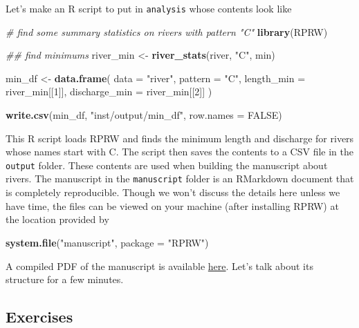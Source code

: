 \documentclass[
]{book}
\newenvironment{Shaded}{\begin{snugshade}}{\end{snugshade}}
\newcommand{\CommentTok}[1]{\textcolor[rgb]{0.56,0.35,0.01}{\textit{#1}}}
\newcommand{\DataTypeTok}[1]{\textcolor[rgb]{0.13,0.29,0.53}{#1}}
\newcommand{\DecValTok}[1]{\textcolor[rgb]{0.00,0.00,0.81}{#1}}
\newcommand{\KeywordTok}[1]{\textcolor[rgb]{0.13,0.29,0.53}{\textbf{#1}}}
\newcommand{\NormalTok}[1]{#1}
\newcommand{\OtherTok}[1]{\textcolor[rgb]{0.56,0.35,0.01}{#1}}
\newcommand{\StringTok}[1]{\textcolor[rgb]{0.31,0.60,0.02}{#1}}
\begin{document}
Let's make an R script to put in \texttt{analysis} whose contents look like

\begin{Shaded}
\begin{Highlighting}[]
\CommentTok{# find some summary statistics on rivers with pattern "C"}
\KeywordTok{library}\NormalTok{(RPRW)}

\CommentTok{## find minimums}
\NormalTok{river_min <-}\StringTok{ }\KeywordTok{river_stats}\NormalTok{(river, }\StringTok{"C"}\NormalTok{, min)}

\NormalTok{min_df <-}\StringTok{ }\KeywordTok{data.frame}\NormalTok{(}
  \DataTypeTok{data =} \StringTok{"river"}\NormalTok{,}
  \DataTypeTok{pattern =} \StringTok{"C"}\NormalTok{,}
  \DataTypeTok{length_min =}\NormalTok{ river_min[[}\DecValTok{1}\NormalTok{]],}
  \DataTypeTok{discharge_min =}\NormalTok{ river_min[[}\DecValTok{2}\NormalTok{]]}
\NormalTok{)}

\KeywordTok{write.csv}\NormalTok{(min_df, }\StringTok{"inst/output/min_df"}\NormalTok{, }\DataTypeTok{row.names =} \OtherTok{FALSE}\NormalTok{)}
\end{Highlighting}
\end{Shaded}

This R script loads RPRW and finds the minimum length and discharge for rivers whose names start with C. The script then saves the contents to a CSV file in the \texttt{output} folder. These contents are used when building the manuscript about rivers. The manuscript in the \texttt{manuscript} folder is an RMarkdown document that is completely reproducible. Though we won't discuss the details here unless we have time, the files can be viewed on your machine (after installing RPRW) at the location provided by

\begin{Shaded}
\begin{Highlighting}[]
\KeywordTok{system.file}\NormalTok{(}\StringTok{"manuscript"}\NormalTok{, }\DataTypeTok{package =} \StringTok{"RPRW"}\NormalTok{)}
\end{Highlighting}
\end{Shaded}

A compiled PDF of the manuscript is available \href{https://github.com/michaeldumelle/RPRW/blob/main/inst/manuscript/manuscript.pdf}{here}. Let's talk about its structure for a few minutes.

\hypertarget{ex-set8}{%
\subsection{Exercises}\label{ex-set8}}
\end{document}
